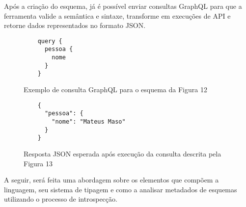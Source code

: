 Após a criação do esquema, já é possível enviar consultas GraphQL para que a ferramenta valide a semântica e sintaxe, transforme em execuções de API e retorne dados representados no formato JSON.  \cite{GraphQL2016}

\begin{figure}[H]
  \centering
  \begin{verbatim}
    query {
      pessoa {
        nome
      }
    }
  \end{verbatim}
  \caption{Exemplo de consulta GraphQL para o esquema da Figura 12}
\end{figure}

\begin{figure}[H]
  \centering
  \begin{verbatim}
    {
      "pessoa": {
        "nome": "Mateus Maso"
      }
    }
  \end{verbatim}
  \caption{Resposta JSON esperada após execução da consulta descrita pela Figura 13}
\end{figure}

A seguir, será feita uma abordagem sobre os elementos que compõem a linguagem, seu sistema de tipagem e como a analisar metadados de esquemas utilizando o processo de introspecção.




